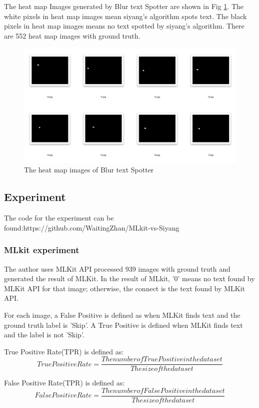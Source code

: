 \documentclass[11pt]{ucscthesis}
\begin{document}
 
 The heat map Images generated by Blur text Spotter are shown in Fig
\ref{Blurdata}. The white pixels in heat map images mean siyang's algorithm spots text. The black pixels in heat map images means no text spotted by siyang's algorithm. There are 552 heat map images with ground truth.


 \begin{figure}
    \centering
    \includegraphics[width =0.8\linewidth]{Fig/BlurData.png}
    \caption{The heat map images of Blur text Spotter}
    \label{Blurdata}
\end{figure}
 
 
\subsection{Experiment}
The code for the experiment can be found:https://github.com/WaitingZhan/MLkit-vs-Siyang
\subsubsection{MLkit experiment}
The author uses MLKit API processed 939 images with ground truth and generated the result of MLKit. In the result of MLkit, '0' means no text found by MLKit API for that image; otherwise, the connect is the text found by MLKit API.
 
For each image, a False Positive is defined as when MLKit finds text and the ground truth label is 'Skip'. A True Positive is defined when MLKit finds text and the label is not 'Skip'.

True Positive Rate(TPR) is defined as:
\begin{equation*}
    True Positive Rate =\frac{The number of True Positive in the dataset}{The size of the dataset}
\end{equation*}

False Positive Rate(TPR) is defined as:
\begin{equation*}
    False Positive Rate =\frac{The number of False Positive in the dataset}{The size of the dataset}
\end{equation*}
\end{document}
